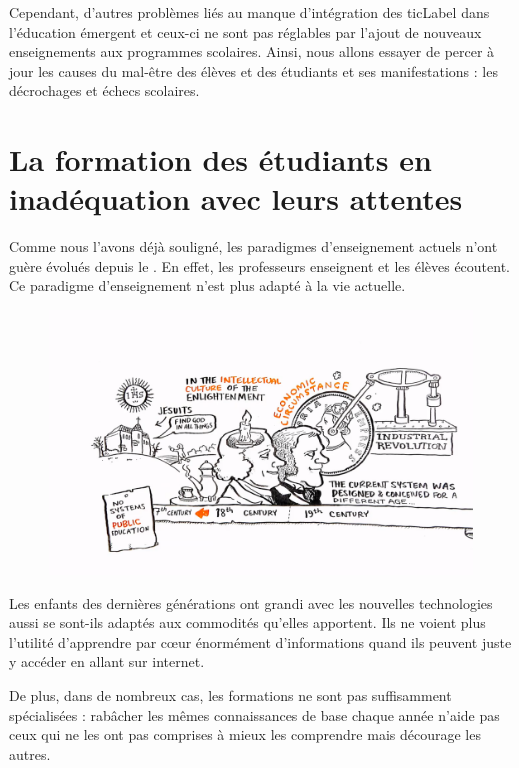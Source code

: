 Cependant, d'autres problèmes liés au manque d'intégration des \gls{ticLabel} dans l'éducation émergent et ceux-ci ne sont pas réglables par l'ajout de nouveaux enseignements aux programmes scolaires. Ainsi, nous allons essayer de percer à jour les causes du mal-être des élèves et des étudiants et ses manifestations : les décrochages et échecs scolaires.

\section{La formation des étudiants en inadéquation avec leurs attentes}
Comme nous l'avons déjà souligné, les paradigmes d'enseignement actuels n'ont guère évolués depuis le  \cite{robinson2010paradigms}. En effet, les professeurs enseignent et les élèves écoutent. Ce paradigme d'enseignement n'est plus adapté à la vie actuelle.

\begin{figure}[h]
\centering
\includegraphics[trim=2cm 1.5cm 0cm 1.5cm, clip=true, width=\linewidth]{../resources/illustrations/public_education}
\end{figure}

Les enfants des dernières générations ont grandi avec les nouvelles technologies aussi se sont-ils adaptés aux commodités qu'elles apportent. Ils ne voient plus l'utilité d'apprendre par cœur énormément d'informations quand ils peuvent juste y accéder en allant sur internet.

De plus, dans de nombreux cas, les formations ne sont pas suffisamment spécialisées : rabâcher les mêmes connaissances de base chaque année n'aide pas ceux qui ne les ont pas comprises à mieux les comprendre mais décourage les autres.

